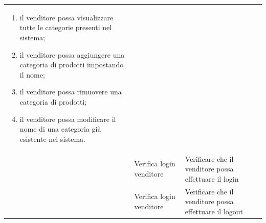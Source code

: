 \begin{center}
\begin{longtable}{|p{1cm}|p{4.85cm}|p{9cm}|}
\begin{enumerate}
		\item il venditore possa visualizzare tutte le categorie presenti nel sistema;
		\item il venditore possa aggiungere una categoria di prodotti impostando il nome;
		\item il venditore possa rimuovere una categoria di prodotti;
		\item il venditore possa modificare il nome di una categoria già esistente nel sistema.
	\end{enumerate} \\
	 & Verifica login venditore & Verificare che il venditore possa effettuare il login \\
	 & Verifica login venditore & Verificare che il venditore possa effettuare il logout \\
	\hline
	\end{longtable}
\end{center}


